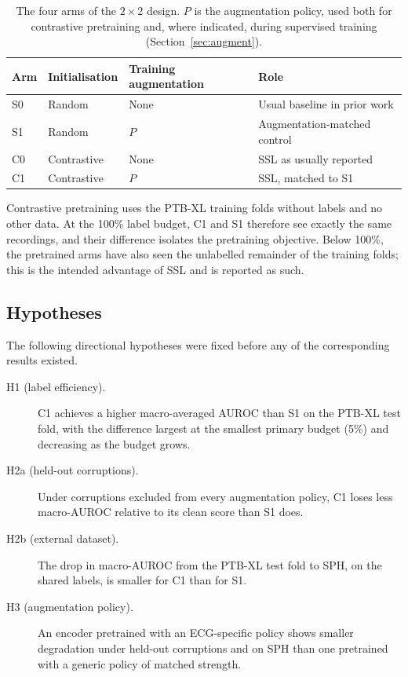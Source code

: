 \documentclass[preprint,12pt]{elsarticle}
\begin{document}
\begin{table}[t]
\centering
\caption{The four arms of the $2\times2$ design. $P$ is the augmentation policy, used both for contrastive pretraining and, where indicated, during supervised training (Section~\ref{sec:augment}).}
\label{tab:arms}
\footnotesize
\begin{tabular}{llll}
\toprule
Arm & Initialisation & Training augmentation & Role \\
\midrule
S0 & Random      & None & Usual baseline in prior work \\
S1 & Random      & $P$  & Augmentation-matched control \\
C0 & Contrastive & None & SSL as usually reported \\
C1 & Contrastive & $P$  & SSL, matched to S1 \\
\bottomrule
\end{tabular}
\end{table}

Contrastive pretraining uses the PTB-XL training folds without labels and no other data. At the 100\% label budget, C1 and S1 therefore see exactly the same recordings, and their difference isolates the pretraining objective. Below 100\%, the pretrained arms have also seen the unlabelled remainder of the training folds; this is the intended advantage of SSL and is reported as such.

\subsection{Hypotheses}

The following directional hypotheses were fixed before any of the corresponding results existed.

\begin{description}
  \item[H1 (label efficiency).] C1 achieves a higher macro-averaged AUROC than S1 on the PTB-XL test fold, with the difference largest at the smallest primary budget (5\%) and decreasing as the budget grows.
  \item[H2a (held-out corruptions).] Under corruptions excluded from every augmentation policy, C1 loses less macro-AUROC relative to its clean score than S1 does.
  \item[H2b (external dataset).] The drop in macro-AUROC from the PTB-XL test fold to SPH, on the shared labels, is smaller for C1 than for S1.
  \item[H3 (augmentation policy).] An encoder pretrained with an ECG-specific policy shows smaller degradation under held-out corruptions and on SPH than one pretrained with a generic policy of matched strength.
\end{description}
\end{document}
